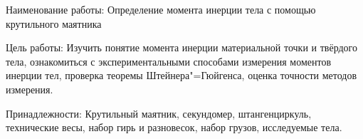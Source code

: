 Наименование работы: Определение момента инерции тела с помощью крутильного маятника

Цель работы:
Изучить понятие момента инерции материальной точки и твёрдого тела,
ознакомиться с экспериментальными способами измерения моментов инерции тел,
проверка теоремы Штейнера"=Гюйгенса, оценка точности методов измерения.

Принадлежности: 
Крутильный маятник, секундомер, штангенциркуль,
технические весы, набор гирь и разновесок, набор грузов, исследуемые тела.